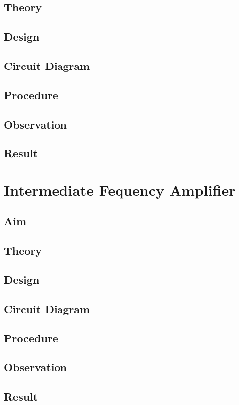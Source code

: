 \documentclass{book}
\begin{document}
\section*{Theory}
\section*{Design}
\section*{Circuit Diagram}
\section*{Procedure}
\section*{Observation}
\section*{Result}

\chapter[Intermediate Fequency Amplifier]{Intermediate Fequency Amplifier}
\section*{Aim}
\section*{Theory}
\section*{Design}
\section*{Circuit Diagram}
\section*{Procedure}
\section*{Observation}
\section*{Result}
\end{document}
